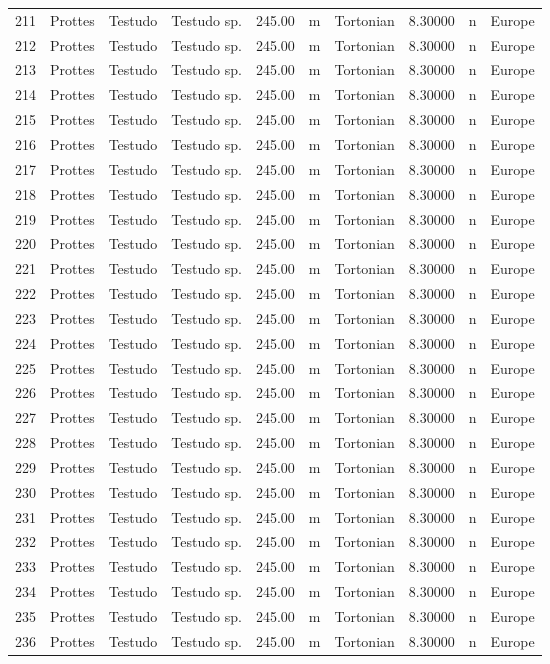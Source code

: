 \documentclass[]{article}
\begin{document}
\begin{longtable}[]{@{}llllrllrll@{}}
211 & Prottes & Testudo & Testudo sp. & 245.00 & m & Tortonian & 8.30000
& n & Europe\tabularnewline
212 & Prottes & Testudo & Testudo sp. & 245.00 & m & Tortonian & 8.30000
& n & Europe\tabularnewline
213 & Prottes & Testudo & Testudo sp. & 245.00 & m & Tortonian & 8.30000
& n & Europe\tabularnewline
214 & Prottes & Testudo & Testudo sp. & 245.00 & m & Tortonian & 8.30000
& n & Europe\tabularnewline
215 & Prottes & Testudo & Testudo sp. & 245.00 & m & Tortonian & 8.30000
& n & Europe\tabularnewline
216 & Prottes & Testudo & Testudo sp. & 245.00 & m & Tortonian & 8.30000
& n & Europe\tabularnewline
217 & Prottes & Testudo & Testudo sp. & 245.00 & m & Tortonian & 8.30000
& n & Europe\tabularnewline
218 & Prottes & Testudo & Testudo sp. & 245.00 & m & Tortonian & 8.30000
& n & Europe\tabularnewline
219 & Prottes & Testudo & Testudo sp. & 245.00 & m & Tortonian & 8.30000
& n & Europe\tabularnewline
220 & Prottes & Testudo & Testudo sp. & 245.00 & m & Tortonian & 8.30000
& n & Europe\tabularnewline
221 & Prottes & Testudo & Testudo sp. & 245.00 & m & Tortonian & 8.30000
& n & Europe\tabularnewline
222 & Prottes & Testudo & Testudo sp. & 245.00 & m & Tortonian & 8.30000
& n & Europe\tabularnewline
223 & Prottes & Testudo & Testudo sp. & 245.00 & m & Tortonian & 8.30000
& n & Europe\tabularnewline
224 & Prottes & Testudo & Testudo sp. & 245.00 & m & Tortonian & 8.30000
& n & Europe\tabularnewline
225 & Prottes & Testudo & Testudo sp. & 245.00 & m & Tortonian & 8.30000
& n & Europe\tabularnewline
226 & Prottes & Testudo & Testudo sp. & 245.00 & m & Tortonian & 8.30000
& n & Europe\tabularnewline
227 & Prottes & Testudo & Testudo sp. & 245.00 & m & Tortonian & 8.30000
& n & Europe\tabularnewline
228 & Prottes & Testudo & Testudo sp. & 245.00 & m & Tortonian & 8.30000
& n & Europe\tabularnewline
229 & Prottes & Testudo & Testudo sp. & 245.00 & m & Tortonian & 8.30000
& n & Europe\tabularnewline
230 & Prottes & Testudo & Testudo sp. & 245.00 & m & Tortonian & 8.30000
& n & Europe\tabularnewline
231 & Prottes & Testudo & Testudo sp. & 245.00 & m & Tortonian & 8.30000
& n & Europe\tabularnewline
232 & Prottes & Testudo & Testudo sp. & 245.00 & m & Tortonian & 8.30000
& n & Europe\tabularnewline
233 & Prottes & Testudo & Testudo sp. & 245.00 & m & Tortonian & 8.30000
& n & Europe\tabularnewline
234 & Prottes & Testudo & Testudo sp. & 245.00 & m & Tortonian & 8.30000
& n & Europe\tabularnewline
235 & Prottes & Testudo & Testudo sp. & 245.00 & m & Tortonian & 8.30000
& n & Europe\tabularnewline
236 & Prottes & Testudo & Testudo sp. & 245.00 & m & Tortonian & 8.30000
& n & Europe\tabularnewline

\end{longtable}
\end{document}
